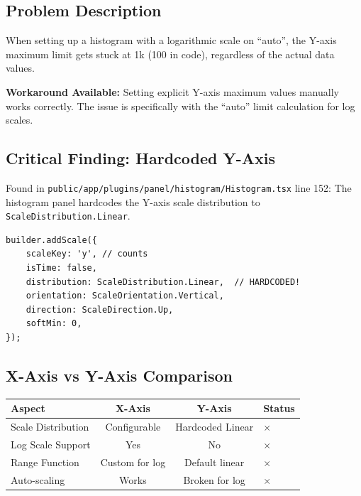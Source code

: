 \documentclass[
    11pt,
    a4paper,
    oneside,
    abstract=on,
    parskip=full+,
    headings=big,
    bibliography=totoc
]{scrartcl}
\newcommand{\code}[1]{\texttt{#1}}
\begin{document}
\subsection{Problem Description}

When setting up a histogram with a logarithmic scale on ``auto'', the Y-axis maximum limit gets stuck at 1k (100 in code), regardless of the actual data values.

\begin{context}
    \textbf{Workaround Available:} Setting explicit Y-axis maximum values manually works correctly. The issue is specifically with the ``auto'' limit calculation for log scales.
\end{context}

\subsection{Critical Finding: Hardcoded Y-Axis}

\begin{keyfinding}
    Found in \code{public/app/plugins/panel/histogram/Histogram.tsx} line 152: The histogram panel hardcodes the Y-axis scale distribution to \code{ScaleDistribution.Linear}.
\end{keyfinding}

\begin{verbatim}
builder.addScale({
    scaleKey: 'y', // counts
    isTime: false,
    distribution: ScaleDistribution.Linear,  // HARDCODED!
    orientation: ScaleOrientation.Vertical,
    direction: ScaleDirection.Up,
    softMin: 0,
});
\end{verbatim}

\subsection{X-Axis vs Y-Axis Comparison}

\begin{tabular}{p{3cm}ccp{4cm}}
    \toprule
    \textbf{Aspect} & \textbf{X-Axis} & \textbf{Y-Axis} & \textbf{Status} \\
    \midrule
    Scale Distribution & Configurable & Hardcoded Linear & $\times$ \\
    Log Scale Support & Yes & No & $\times$ \\
    Range Function & Custom for log & Default linear & $\times$ \\
    Auto-scaling & Works & Broken for log & $\times$ \\
    \bottomrule
\end{tabular}
\end{document}
